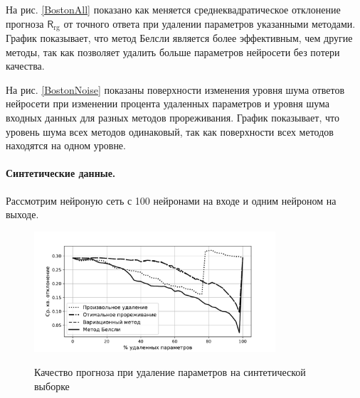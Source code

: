 На рис. \ref{BostonAll} показано как меняется среднеквадратическое отклонение прогноза $\mathsf{R}_{\text{rg}}$ от точного ответа  при удалении параметров указанными методами. График показывает, что метод Белсли является более эффективным, чем другие методы, так как позволяет удалить больше параметров нейросети без потери качества.

На рис. \ref{BostonNoise} показаны поверхности изменения уровня шума ответов нейросети при изменении процента удаленных параметров и уровня шума входных данных для разных методов прореживания. График показывает, что уровень шума всех методов одинаковый, так как поверхности всех методов находятся на одном уровне.


\paragraph{Синтетические данные.} Рассмотрим нейроную сеть с 100 нейронами на входе и одним нейроном на выходе.

\begin{figure}[h!t]\center
\includegraphics[width=0.8\textwidth]{results/relevant/Data1/All.pdf}\\
\caption{Качество прогноза при удаление параметров на синтетической выборке}
\label{Data1All}
\end{figure}

